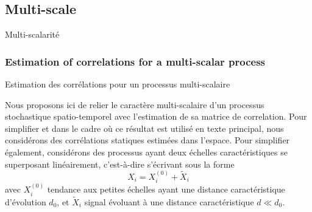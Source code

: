 \begin{figure}
\end{figure}



%




\subsection{Multi-scale}{Multi-scalarité}


\subsubsection{Estimation of correlations for a multi-scalar process}{Estimation des corrélations pour un processus multi-scalaire}

Nous proposons ici de relier le caractère multi-scalaire d'un processus stochastique spatio-temporel avec l'estimation de sa matrice de correlation. Pour simplifier et dans le cadre où ce résultat est utilisé en texte principal, nous considérons des corrélations statiques estimées dans l'espace. Pour simplifier également, considérons des processus ayant deux échelles caractéristiques se superposant linéairement, c'est-à-dire s'écrivant sous la forme
\[
X_i = X_i^{(0)} + \tilde{X}_i
\]
avec $X_i^{(0)}$ tendance aux petites échelles ayant une distance caractéristique d'évolution $d_0$, et $\tilde{X}_i$ signal évoluant à une distance caractéristique $d \ll d_0$.

